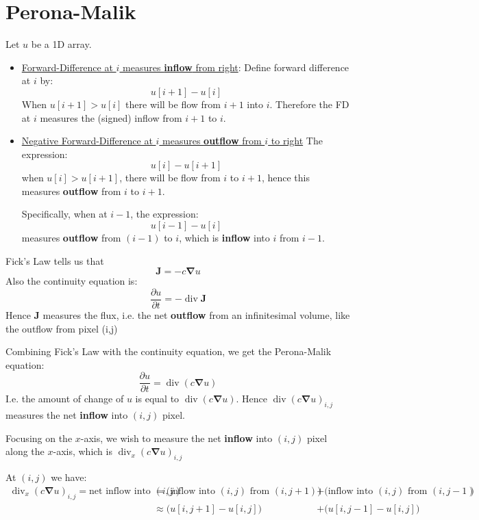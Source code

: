 \documentclass{article}
\begin{document}
\section{Perona-Malik}
\begin{theorem} \label{th:FDAndFlow} Let $u$ be a 1D array. 
\begin{itemize}
\item \ul{Forward-Difference at $i$ measures \textbf{inflow} from right}: Define forward difference at $i$ by:
\[ u[i+1]-u[i]  \]
When $u[i+1] > u[i]$ there will be flow from $i+1$ into $i$. Therefore the FD at $i$ measures the (signed) inflow from $i+1$ to $i$. 

\item \ul{Negative Forward-Difference at $i$ measures \textbf{outflow} from $i$ to right} The expression:
\[
    u[i]-u[i+1]
\]
  when $u[i] > u[i+1]$, there will be flow from $i$ to $i+1$, hence this measures \textbf{outflow} from $i$ to $i+1$. 

Specifically, when at $i-1$, the expression:
\[
 u[i-1]-u[i]
\]
 measures \textbf{outflow} from $(i-1)$ to $i$, which is \textbf{inflow} into $i$ from $i-1$.
  \end{itemize}
\end{theorem}
\begin{theorem}
Fick's Law tells us that 
\begin{equation}
  \bm{J} = - c \bm{\nabla} u
\end{equation}
Also the continuity equation is:
\begin{equation}
  \frac{\partial u}{\partial t} = - \operatorname{div} \bm{J}
\end{equation}
Hence $\bm{J}$ measures the flux, i.e. the net \textbf{outflow} from an infinitesimal volume, like the outflow from pixel (i,j)

Combining Fick's Law with the continuity equation, we get the Perona-Malik equation:
\[
  \frac{\partial u}{\partial t}  = \operatorname{div}(c \bm{\nabla}  u)
\]
  I.e. the amount of change of $u$ is equal to $\operatorname{div}(c \bm{\nabla} u)$. Hence $\operatorname{div}(c \bm{\nabla} u)_{i,j}$ measures the net \textbf{inflow} into $(i,j)$ pixel. 

Focusing on the $x$-axis, we wish to measure the net \textbf{inflow} into $(i,j)$ pixel along the $x$-axis, which is $\operatorname{div}_{x}(c \bm{\nabla} u)_{i,j}$

At $(i,j)$ we have:
\[
\begin{alignedat}{3}
  \operatorname{div}_{x}(c \bm{\nabla} u)_{i,j} = \text{net inflow into $(i,j)$} 
    &= \Big( \text{inflow into $(i,j)$ from $(i, j+1)$} \Big) 
    &&+ \Big( \text{inflow into $(i,j)$ from $(i, j-1)$} \Big) \\
  &\approx \Big( u[i,j+1] - u[i,j] \Big) 
    &&+ \Big( u[i,j-1] - u[i,j] \Big)
\end{alignedat}
\]

\end{theorem}
\end{document}
